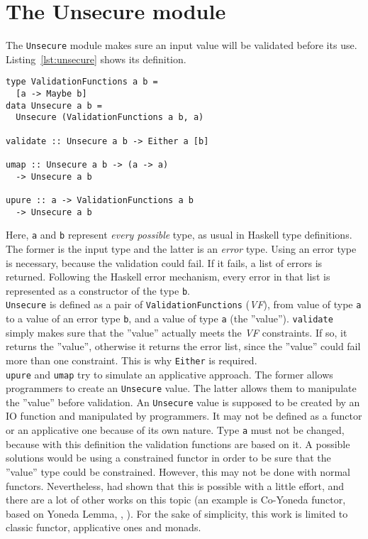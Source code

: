 \section{The Unsecure module}\label{sec:usecure}
The \texttt{Unsecure} module makes sure an input value will be validated before its use. Listing~\ref{lst:unsecure} shows its definition.

\begin{lstlisting}[caption={Unsecure module}, label={lst:unsecure}, frame=single]
type ValidationFunctions a b =
  [a -> Maybe b]
data Unsecure a b =  
  Unsecure (ValidationFunctions a b, a)
 
validate :: Unsecure a b -> Either a [b]

umap :: Unsecure a b -> (a -> a) 
  -> Unsecure a b

upure :: a -> ValidationFunctions a b
  -> Unsecure a b
\end{lstlisting}
Here, \texttt{a} and \texttt{b} represent \textit{every possible} type, as usual in Haskell type definitions. The former is the input type and the latter is an \textit{error} type. Using an error type is necessary, because the validation could fail. If it fails, a list of errors is returned. Following the Haskell error mechanism, every error in that list is represented as a constructor of the type \texttt{b}. \\
\texttt{Unsecure} is defined as a pair of \texttt{ValidationFunctions} (\textit{VF}), from value of type \texttt{a} to a value of an error type \texttt{b}, and a value of type \texttt{a} (the ''value''). \texttt{validate} simply makes sure that the ''value'' actually meets the \textit{VF} constraints. If so, it returns the ''value'', otherwise it returns the error list, since the ''value'' could fail more than one constraint. This is why \texttt{Either} is required. \\
\texttt{upure} and \texttt{umap} try to simulate an applicative approach. The former allows programmers to create an \texttt{Unsecure} value. The latter allows them to manipulate the ''value'' before validation. An \texttt{Unsecure} value is supposed to be created by an IO function and manipulated by programmers. It may not be defined as a functor or an applicative one because of its own nature. Type \texttt{a} must not be changed, because with this definition the validation functions are based on it. A possible solutions would be using a constrained functor in order to be sure that the ''value'' type could be constrained. However, this may not be done with normal functors. Nevertheless, \citeauthor{Sculthorpe:13:ConstrainedMonad} \cite{Sculthorpe:13:ConstrainedMonad} had shown that this is possible with a little effort, and there are a lot of other works on this topic (an example is Co-Yoneda functor, based on Yoneda Lemma, \cite{elkins2009calculating}, \cite{yoneda}). For the sake of simplicity, this work is limited to classic functor, applicative ones and monads. \\

